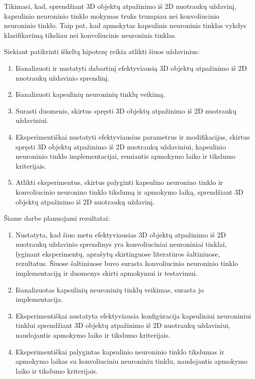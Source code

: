 Tikimasi, kad, sprendžiant 3D objektų atpažinimo iš 2D nuotraukų uždavinį, kapsulinio neuroninio tinklo mokymas truks trumpiau nei konvoliucinio neuroninio tinklo. Taip pat, kad apmokytas kapsulinis neuroninis tinklas vykdys klasifikavimą tiksliau nei konvoliucinis neuroninis tinklas.

Siekiant patikrinti iškeltą hipotezę reikia atlikti šiuos uždavinius:

\begin{enumerate}
	\item Išanalizuoti ir nustatyti dabartinį efektyviausią 3D objektų atpažinimo iš 2D nuotraukų uždavinio sprendinį.
	\item Išanalizuoti kapsulinių neuroninių tinklų veikimą.
	\item Surasti duomenis, skirtus spręsti 3D objektų atpažinimo iš 2D nuotraukų uždaviniui.
	\item Eksperimentiškai nustatyti efektyviausius parametrus ir modifikacijas, skirtus spręsti 3D objektų atpažinimo iš 2D nuotraukų uždaviniui, kapsulinio neuroninio tinklo implementacijai, remiantis apmokymo laiko ir tikslumo kriterijais.
	\item Atlikti eksperimentus, skirtus palyginti kapsulino neuronino tinklo ir konvoliucinio neuronino tinklo tikslumą ir apmokymo laiką, sprendžiant 3D objektų atpažinimo iš 2D nuotraukų uždavinį.
\end{enumerate}

Šiame darbe planuojami rezultatai:

\begin{enumerate}
	\item Nustatyta, kad šiuo metu efektyviausias 3D objektų atpažinimo iš 2D nuotraukų uždavinio sprendinys yra konvoliuciniai neuroniniai tinklai, lyginant eksperimentų, aprašytų skirtinguose literatūros šaltiniuose, rezultatus. Šiuose šaltiniuose buvo surasta konvoliucinio neuroninio tinklo implementaciją ir duomenys skirti apmokymui ir testavimui.
	\item Išanalizuotas kapsulinių neuroninių tinklų veikimas, surasta jo implementacija.
	\item Eksperimentiškai nustatyta efektyviausia konfigūracija kapsuliniui neuroniniui tinklui sprendžiant 3D objektų atpažinimo iš 2D nuotraukų uždaviniui, naudojantis apmokymo laiko ir tikslumo kriterijais.
	\item Eksperimentiškai palygintas kapsulinio neuroninio tinklo tikslumas ir apmokymo laikas su konvoliuciniu neuroniniu tinklu, naudojantis apmokymo laiko ir tikslumo kriterijais.
\end{enumerate}

